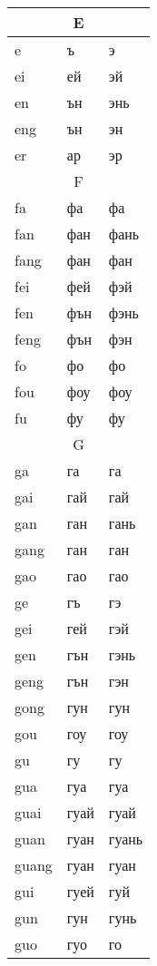 \begin{longtable}{|l|l|l|}
\multicolumn{3}{|c|}{E} \\
\hline
e &ъ &э
\\ei &ей &эй
\\en &ън &энь
\\eng &ън &эн
\\er &ар &эр
\\

\hline

\multicolumn{3}{|c|}{F} \\ \hline
fa &фа &фа
\\fan &фан &фань
\\fang &фан &фан
\\fei &фей &фэй
\\fen &фън &фэнь
\\feng &фън &фэн
\\fo &фо &фо
\\fou &фоу &фоу
\\fu &фу &фу
\\
\hline

\multicolumn{3}{|c|}{G} \\ \hline

ga &га &га 
\\gai &гай &гай
\\gan &ган &гань
\\gang &ган &ган
\\gao &гао &гао
\\ge &гъ &гэ
\\gei &гей &гэй
\\gen &гън &гэнь
\\geng &гън &гэн
\\gong &гун &гун
\\gou &гоу &гоу
\\gu &гу &гу
\\gua &гуа &гуа
\\guai &гуай &гуай
\\guan &гуан &гуань
\\guang &гуан &гуан
\\gui &гуей &гуй
\\gun &гун &гунь
\\guo &гуо &го
\\
\hline


\end{longtable}
